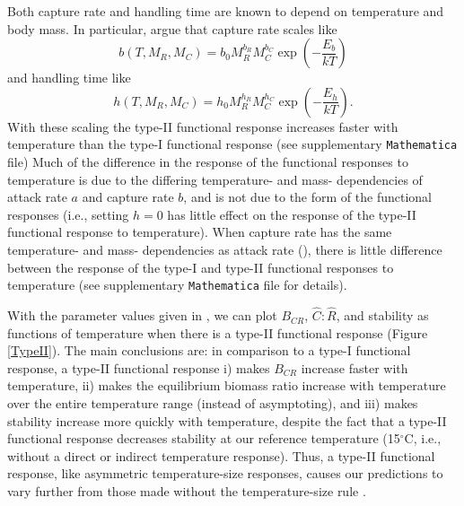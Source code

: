 \documentclass[11pt]{article}
\begin{document}
Both capture rate and handling time are known to depend on temperature and body mass.
In particular, \cite{Rall2012} argue that capture rate scales like 
\[b(T, M_R, M_C) = b_0 M_R^{b_R} M_C^{b_C} \exp \left(- \frac{E_b}{k T} \right)\]
and handling time like 
\[h(T, M_R, M_C) = h_0 M_R^{h_R} M_C^{h_C} \exp \left(-\frac{E_h}{k T} \right).\]
With these scaling the type-II functional response increases faster with temperature than the type-I functional response (see supplementary \texttt{Mathematica} file) %
Much of the difference in the response of the functional responses to temperature is due to the differing temperature- and mass- dependencies of attack rate $a$ and capture rate $b$, and is not due to the form of the functional responses (i.e., setting $h=0$ has little effect on the response of the type-II functional response to temperature).
When capture rate has the same temperature- and mass- dependencies as attack rate (\cite{Gilbert2014}), there is little difference between the response of the type-I and type-II functional responses to temperature (see supplementary \texttt{Mathematica} file for details).

With the parameter values given in \cite{Rall2012}, we can plot $B_{CR}$, $\hat{C}:\hat{R}$, and stability as functions of temperature when there is a type-II functional response (Figure \ref{TypeII}).
The main conclusions are: in comparison to a type-I functional response, a type-II functional response i) makes $B_{CR}$ increase faster with temperature, ii) makes the equilibrium biomass ratio increase with temperature over the entire temperature range (instead of asymptoting), and iii) makes stability increase more quickly with temperature, despite the fact that a type-II functional response decreases stability at our reference temperature (15$^\circ$C, i.e., without a direct or indirect temperature response).
Thus, a type-II functional response, like asymmetric temperature-size responses, causes our predictions to vary further from those made without the temperature-size rule \citep{Gilbert2014}.
%
%
\end{document}
